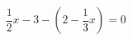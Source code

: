 \begin{ex}
	\begin{condition}
		\( \dfrac{1}{2}x-3-\left(2-\dfrac{1}{3}x\right)=0 \)
	\end{condition}
\end{ex}